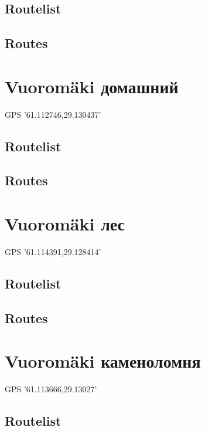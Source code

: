 \documentclass[8pt, a5paper,notitlepage,openany]{report}
\begin{document}
\subsection{Routelist}

\newpage
\subsection{Routes}




%   
\clearpage 
\section{Vuoromäki домашний}
 GPS '61.112746,29.130437'
\subsection{Routelist}

\newpage

\subsection{Routes}

  




\clearpage 
\section{Vuoromäki лес}
 GPS '61.114391,29.128414'
\subsection{Routelist}

\newpage
\subsection{Routes}


\clearpage 
\section{Vuoromäki каменоломня}
 GPS '61.113666,29.13027'
\subsection{Routelist}

\newpage
\end{document}
